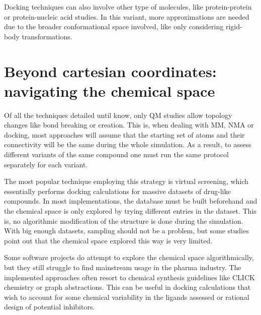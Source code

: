 Docking techniques can also involve other type of molecules, like protein-protein or protein-nucleic acid studies. In this variant, more approximations are needed due to the broader conformational space involved, like only considering rigid-body transformations.

\section{Beyond cartesian coordinates: navigating the chemical space}

Of all the techniques detailed until know, only QM studies allow topology changes like bond breaking or creation. This is, when dealing with MM, NMA or docking, most approaches will assume that the starting set of atoms and their connectivity will be the same during the whole simulation. As a result, to assess different variants of the same compound one must run the same protocol separately for each variant.

The most popular technique employing this strategy is virtual screening, which essentially performs docking calculations for massive datasets of drug-like compounds. In most implementations, the database must be built beforehand and the chemical space is only explored by trying different entries in the dataset. This is, no algorithmic modification of the structure is done during the simulation. With big enough datasets, sampling should not be a problem, but some studies point out that the chemical space explored this way is very limited.\cite{virshup2013stochastic}

Some software projects do attempt to explore the chemical space algorithmically,\cite{oprea2001chemography,bon2010bioactivity,larsson2007chemgps,Goodnow_2016,Reymond_2015,Chari_2015,Maggiora_2014,Naveja_2017} but they still struggle to find mainstream usage in the pharma industry. The implemented approaches often resort to chemical synthesis guidelines like CLICK chemistry\cite{durrant2009} or graph abstractions.\cite{andersen2014} This can be useful in docking calculations that wish to account for some chemical variability in the ligands assessed or rational design of potential inhibitors.

